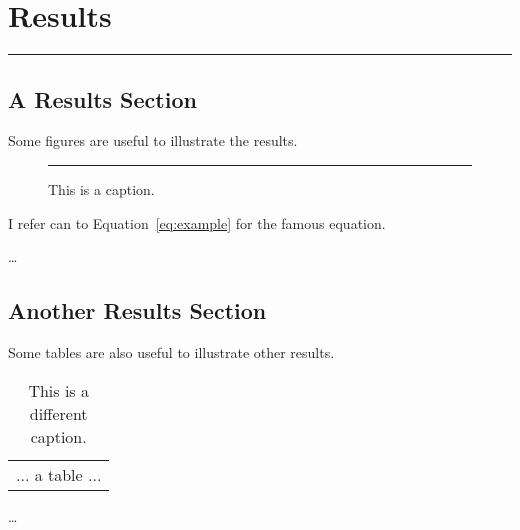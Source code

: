 \chapter{Results}

\lhead{}

\vspace{-1.6cm}
\begingroup
\color{gray}
\par\noindent\rule{\textwidth}{0.4pt}
\endgroup


\section{A Results Section}

Some figures are useful to illustrate the results.

\begin{figure}[h]
    \centering
    \rule{1cm}{1cm} %
    \caption{This is a caption.}
    \label{fig:example}
\end{figure}

I refer can to Equation~\ref{eq:example} for the famous equation.

\ldots


\section{Another Results Section}

Some tables are also useful to illustrate other results.

\begin{table}[h]
    \centering
    \caption{This is a different caption.}
    \label{tab:example}
    \begin{tabular}{|l|}
        ... a table ...
    \end{tabular}
\end{table}

\ldots
